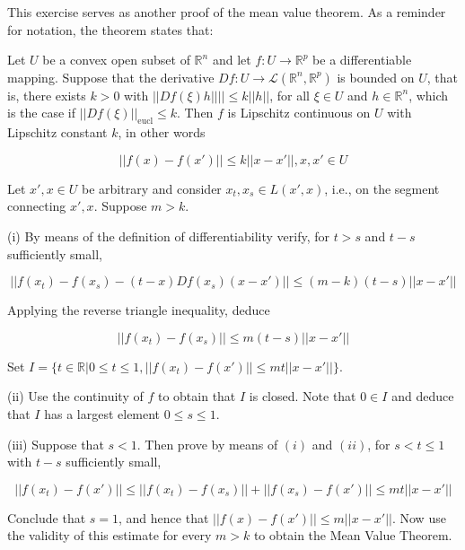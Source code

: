 \begin{exercise}{23}
    This exercise serves as another proof of the mean value theorem.
    As a reminder for notation, the theorem states that:

    Let $U$ be a convex open subset of $\mathbb{R}^n$ and let $f: U \rightarrow \mathbb{R}^p$ be a differentiable mapping.
    Suppose that the derivative $Df: U \rightarrow \mathcal{L}(\mathbb{R}^n, \mathbb{R}^p)$ is bounded on $U$, that is, there exists $k > 0$ with $\lvert \lvert Df(\xi)h \rvert \rvert \rvert \rvert \leq k \lvert \lvert h \rvert \rvert$, for all $\xi \in U$ and $h \in \mathbb{R}^n$, which is the case if $\lvert \lvert Df(\xi) \rvert \rvert_{\text{eucl}} \leq k$.
    Then $f$ is Lipschitz continuous on $U$ with Lipschitz constant $k$, in other words

    $$\lvert \lvert f(x) - f(x') \rvert \rvert \leq k \lvert \lvert x - x' \rvert \rvert, x, x' \in U$$

    Let $x', x \in U$ be arbitrary and consider $x_t, x_s \in L(x', x)$, i.e., on the segment connecting $x', x$.
    Suppose $m > k$.

    (i) By means of the definition of differentiability verify, for $t > s$ and $t - s$ sufficiently small,

    $$\lvert \lvert f(x_t) - f(x_s) - (t - x)Df(x_s)(x - x') \rvert \rvert \leq (m - k)(t - s)\lvert \lvert x - x' \rvert \rvert$$

    Applying the reverse triangle inequality, deduce
    
    $$\lvert \lvert f(x_t) - f(x_s) \rvert \rvert \leq m(t - s)\lvert \lvert x - x' \rvert \rvert$$

    Set $I = \{t \in \mathbb{R} \lvert 0 \leq t \leq 1, \lvert \lvert f(x_t) - f(x') \rvert \rvert \leq mt \lvert \lvert x - x' \rvert \rvert\}$.

    (ii) Use the continuity of $f$ to obtain that $I$ is closed.
    Note that $0 \in I$ and deduce that $I$ has a largest element $0 \leq s \leq 1$.

    (iii) Suppose that $s < 1$.
    Then prove by means of $(i)$ and $(ii)$, for $s < t \leq 1$ with $t - s$ sufficiently small,

    $$\lvert \lvert f(x_t) - f(x') \rvert \rvert \leq \lvert \lvert f(x_t) - f(x_s) \rvert \rvert + \lvert \lvert f(x_s) - f(x') \rvert \rvert \leq mt\lvert \lvert x - x' \rvert \rvert$$

    Conclude that $s = 1$, and hence that $\lvert \lvert f(x) - f(x') \rvert \rvert \leq m \lvert \lvert x - x' \rvert \rvert$.
    Now use the validity of this estimate for every $m > k$ to obtain the Mean Value Theorem.

\end{exercise}

